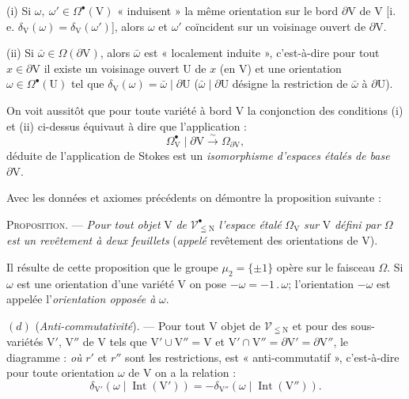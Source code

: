 (i) Si $\omega,\ \omega'\in\Omega^{\bullet}(\mathrm{V})$ « induisent » la même orientation sur le bord $\partial\mathrm{V}$ de $\mathrm{V}$ [i. e. $\delta_{\mathrm{V}}(\omega)=\delta_{\mathrm{V}}(\omega')$], alors $\omega$ et $\omega'$ coïncident sur un voisinage ouvert de $\partial\mathrm{V}$.

(ii) Si $\bar{\omega}\in\Omega(\partial\mathrm{V})$, alors $\bar{\omega}$ est « localement induite », c'est-à-dire pour tout $x\in\partial\mathrm{V}$ il existe un voisinage ouvert $\mathrm{U}$ de $x$ (en $\mathrm{V}$) et une orientation $\omega\in\Omega^{\bullet}(\mathrm{U})$ tel que $\delta_{\mathrm{V}}(\omega)=\bar{\omega}\mid\partial\mathrm{U}$ ($\bar{\omega}\mid\partial\mathrm{U}$ désigne la restriction de $\bar{\omega}$ à $\partial\mathrm{U}$).

On voit aussitôt que pour toute variété à bord $\mathrm{V}$ la conjonction des conditions (i) et (ii) ci-dessus équivaut à dire que l'application :
\[
\Omega^{\bullet}_{\mathrm{V}}\mid\partial\mathrm{V}\overset{\sim}{\to}\Omega_{\partial\mathrm{V}},
\]
déduite de l'application de Stokes est un \textit{isomorphisme d'espaces étalés de base} $\partial\mathrm{V}$.

Avec les données et axiomes précédents on démontre la proposition suivante :

\textsc{Proposition}. --- \textit{Pour tout objet} $\mathrm{V}$ \textit{de} $\mathscr{V}^{\bullet}_{\leqq\mathrm{N}}$ \textit{l'espace étalé} $\Omega_{\mathrm{V}}$ \textit{sur} $\mathrm{V}$ \textit{défini par} $\Omega$ \textit{est un revêtement à deux feuillets} (\textit{appelé} revêtement des orientations de $\mathrm{V}$).

Il résulte de cette proposition que le groupe $\mu_2=\{\pm1\}$ opère sur le faisceau $\Omega$. Si $\omega$ est une orientation d'une variété $\mathrm{V}$ on pose $-\omega=-1\,.\,\omega$; l'orientation $-\omega$ est appelée l'\textit{orientation opposée à} $\omega$.

$(d)$ (\textit{Anti-commutativité}). --- Pour tout $\mathrm{V}$ objet de $\mathscr{V}_{\leqq\mathrm{N}}$ et pour des sous-variétés $\mathrm{V}'$, $\mathrm{V}''$ de $\mathrm{V}$ tels que $\mathrm{V}'\cup\mathrm{V}''=\mathrm{V}$ et $\mathrm{V}'\cap\mathrm{V}''=\partial\mathrm{V}'=\partial\mathrm{V}''$, le diagramme :
\textit{où} $r'$ et $r''$ sont les restrictions, est « anti-commutatif », c'est-à-dire pour toute orientation $\omega$ de $\mathrm{V}$ on a la relation :
\[
\delta_{\mathrm{V}'}(\omega\mid\operatorname{Int}(\mathrm{V}'))=-\delta_{\mathrm{V}''}(\omega\mid\operatorname{Int}(\mathrm{V}'')).
\]

